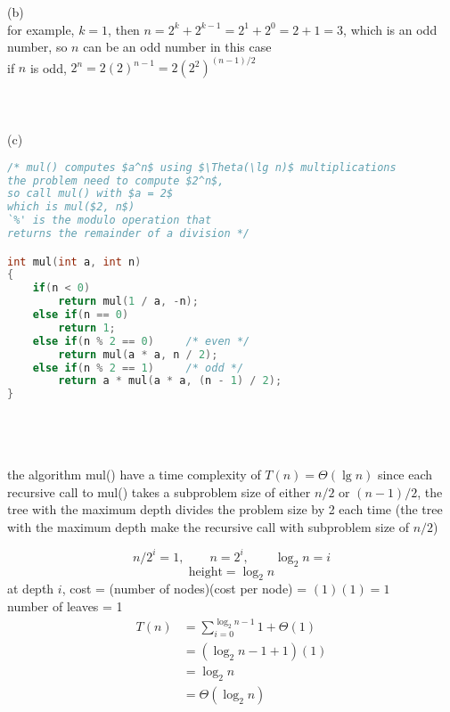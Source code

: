 \documentclass[12pt,border=4pt,multi]{article}%
\begin{document}
(b)\\
for example, $k = 1$, then $n = 2^k + 2^{k - 1} = 2^1 + 2^0 = 2 + 1 = 3$, which is an odd number, so $n$ can be an odd number in this case\\
if $n$ is odd, {\large$2^n = 2(2)^{n - 1} = 2(2^2)^{(n - 1)/2}$}\\
\\
\\
\\
(c)\\
\begin{lstlisting}[language = c, mathescape = true]
/* mul() computes $a^n$ using $\Theta(\lg n)$ multiplications
the problem need to compute $2^n$, 
so call mul() with $a = 2$ 
which is mul($2, n$)
`%' is the modulo operation that
returns the remainder of a division */

int mul(int a, int n)
{
    if(n < 0)
        return mul(1 / a, -n);
    else if(n == 0)
        return 1;
    else if(n % 2 == 0)     /* even */
        return mul(a * a, n / 2);
    else if(n % 2 == 1)     /* odd */
        return a * mul(a * a, (n - 1) / 2);
}
\end{lstlisting}
\leavevmode
\\
\\
\\
the algorithm mul() have a time complexity of $T(n) = \Theta(\lg n)$ since each recursive call to mul() takes a subproblem size of either $n / 2$ or $(n - 1) / 2$, the tree with the maximum depth divides the problem size by 2 each time (the tree with the maximum depth make the recursive call with subproblem size of $n / 2$)\\
\begin{center}
\end{center}
\[n / 2^i = 1, \qquad n = 2^i, \qquad \log_2 n = i\]
\[\text{height} = \log_2 n\]
at depth $i$, cost = (number of nodes)(cost per node) = $(1)(1) = 1$\\
number of leaves = 1\\
\begin{align*}
    T(n) &= \sum_{i = 0}^{\log_2 n - 1} 1 + \Theta(1)\\
    &= (\log_2 n - 1 + 1)(1)\\
    &= \log_2 n\\
    &= \Theta(\log_2 n)\\
\end{align*}
\end{document}
